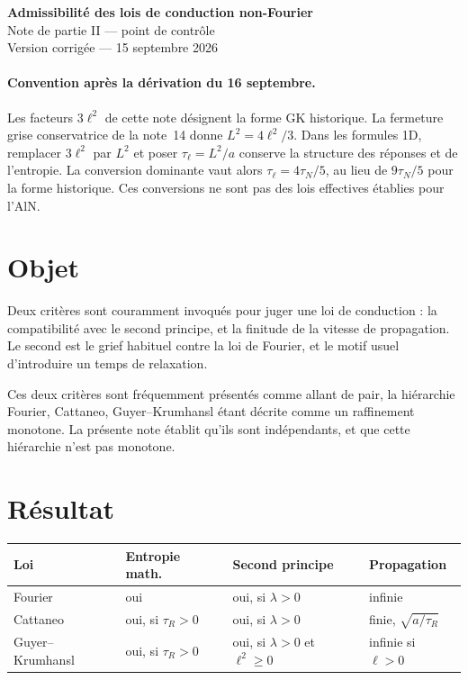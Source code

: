 \documentclass[11pt,a4paper]{article}
\begin{document}
\begin{center}
{\Large\bfseries Admissibilité des lois de conduction non-Fourier}\\[5pt]
{\normalsize Note de partie II --- point de contrôle}\\[2pt]
{\small Version corrigée --- 15 septembre 2026}
\end{center}

\vspace{4pt}

\paragraph{Convention après la dérivation du 16 septembre.}
Les facteurs $3\ell^2$ de cette note désignent la forme GK historique.
La fermeture grise conservatrice de la note~14 donne $L^2=4\ell^2/3$.
Dans les formules 1D, remplacer $3\ell^2$ par $L^2$ et poser
$\tau_\ell=L^2/a$ conserve la structure des réponses et de l'entropie.
La conversion dominante vaut alors $\tau_\ell=4\tau_N/5$, au lieu de
$9\tau_N/5$ pour la forme historique. Ces conversions ne sont pas des
lois effectives établies pour l'AlN.

\section{Objet}

Deux critères sont couramment invoqués pour juger une loi de conduction : la compatibilité avec le
second principe, et la finitude de la vitesse de propagation. Le second est le grief habituel contre
la loi de Fourier, et le motif usuel d'introduire un temps de relaxation.

Ces deux critères sont fréquemment présentés comme allant de pair, la hiérarchie Fourier,
Cattaneo, Guyer--Krumhansl étant décrite comme un raffinement monotone. La présente note établit
qu'ils sont indépendants, et que cette hiérarchie n'est pas monotone.

\section{Résultat}

\begin{center}
\begin{tabularx}{\textwidth}{@{}lXXl@{}}
\toprule
\textbf{Loi} & \textbf{Entropie math.} & \textbf{Second principe} & \textbf{Propagation} \\
\midrule
Fourier & oui & oui, si $\lambda > 0$ & infinie \\
\addlinespace
Cattaneo & oui, si $\tau_R > 0$ & oui, si $\lambda > 0$ & finie, $\sqrt{a/\tau_R}$ \\
\addlinespace
Guyer--Krumhansl & oui, si $\tau_R > 0$ & oui, si $\lambda > 0$ et $\ell^2 \ge 0$ & infinie si $\ell>0$ \\
\bottomrule
\end{tabularx}
\end{center}
\end{document}
